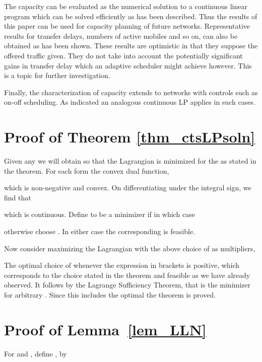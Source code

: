 \documentclass[12pt, draftcls, onecolumn]{IEEEtranTCOM}
\begin{document}
{The capacity can be evaluated as the numerical
solution to a continuous linear program which can be solved efficiently as has been described. Thus
the results of this paper can be used for capacity planning of future networks. Representative
results for transfer delays, numbers of active mobiles and so on, can also be obtained as has
been shown. These results are optimistic in that they suppose the offered traffic given.
They do not take into account the potentially significant gains in transfer delay which an
adaptive scheduler might achieve however. This is a topic for further investigation.

Finally, the characterization of capacity extends to networks with controls such as on-off scheduling.
As indicated an analogous continuous LP applies in such cases.


\appendices







\section{Proof of Theorem \ref{thm_ctsLPsoln}}
\label{appendix_main_proof}
Given any  we will obtain  so that the Lagrangian is minimized
for the  as stated in the theorem. For each  form the convex dual function,
{\small

}
which is non-negative and convex. On differentiating under the integral sign, we find that
{\small

}
which is continuous. Define  to be a minimizer if   in which case
{\small

}
otherwise choose . In either case the corresponding  is feasible.

Now consider maximizing the Lagrangian with the above choice of  as multipliers,
{\small

}
The optimal choice of  whenever the expression in brackets is positive, which corresponds
to the choice stated in the theorem and feasible as we have already observed. It follows by the Lagrange Sufficiency Theorem, \cite{Whittle71} that  is the minimizer for arbitrary . Since this includes the optimal
 the theorem is proved. 
\section{Proof of Lemma~\ref{lem_LLN}}
\label{app_lem_LLN}

For  and , define ,  by

}
\end{document}
